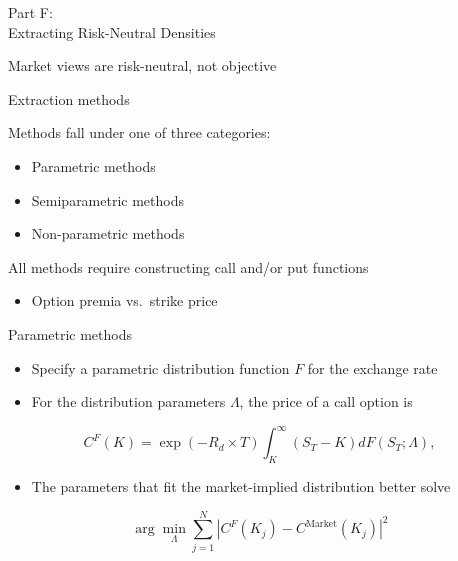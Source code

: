 \begin{frame}{}

\color{blue} \LARGE{Part F:}\\
\LARGE{Extracting Risk-Neutral Densities}

\end{frame}

\begin{frame}{Market views are risk-neutral, not objective}

\end{frame}

\begin{frame}{Extraction methods}

Methods fall under one of three categories:

\begin{itemize}
\tightlist
\item
  Parametric methods
\item
  Semiparametric methods
\item
  Non-parametric methods
\end{itemize}

All methods require constructing call and/or put functions

\begin{itemize}
\tightlist
\item
  Option premia vs.~strike price
\end{itemize}

\end{frame}

\begin{frame}{Parametric methods}

\begin{itemize}
\tightlist
\item
  Specify a parametric distribution function \(F\) for the exchange rate
\item
  For the distribution parameters \(\Lambda\), the price of a call
  option is
\end{itemize}

\[
C^F(K) = \exp(-R_d\times T) \int_{K}^{\infty} \left( S_T - K\right) dF(S_T; \Lambda), 
\]

\begin{itemize}
\tightlist
\item
  The parameters that fit the market-implied distribution better solve
\end{itemize}

\[
\arg\min_{\Lambda} \sum_{j=1}^N |C^F(K_j) - C^{\text{Market}}(K_j)|^2
\]

\end{frame}

